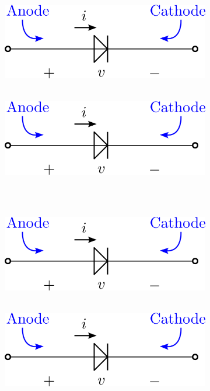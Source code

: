 \documentclass{report}
\begin{document}
\begin{figure}
	\centering
	\begin{subfigure}{0.4\textwidth}
		\centering
		\includegraphics[width=\textwidth]{figures/fig4.1a.png}
		\caption{~}
	\end{subfigure}
	\begin{subfigure}{0.4\textwidth}
		\centering
		\includegraphics[width=\textwidth]{figures/fig4.1a.png}
		\caption{~}
	\end{subfigure} \\
	\begin{subfigure}{0.4\textwidth}
		\centering
		\includegraphics[width=\textwidth]{figures/fig4.1a.png}
		\caption{~}
	\end{subfigure}
	\begin{subfigure}{0.4\textwidth}
		\centering
		\includegraphics[width=\textwidth]{figures/fig4.1a.png}
		\caption{~}
	\end{subfigure}
\end{figure}
\end{document}
